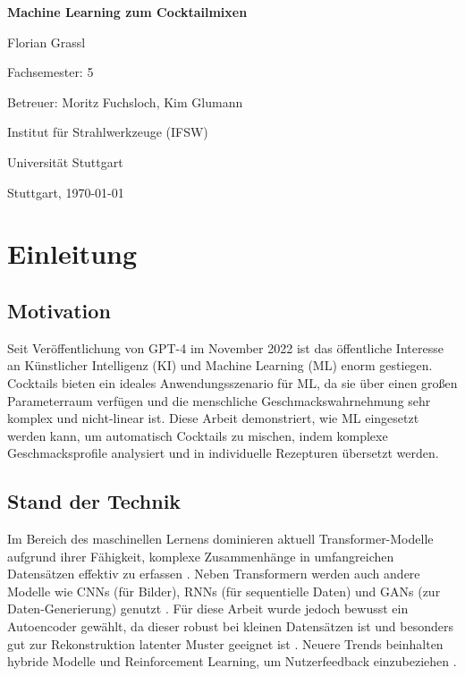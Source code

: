 \documentclass[12pt, a4paper]{report}
\begin{document}
\begin{titlepage}
    \centering
    \vspace*{3cm}
    {\huge \textbf{Machine Learning zum Cocktailmixen} \par}
    \vspace{2cm}
    {\large Florian Grassl \par}
    \vspace{1cm}
    Fachsemester: 5 \par
    \vspace{1cm}
    Betreuer: Moritz Fuchsloch, Kim Glumann \par
    Institut für Strahlwerkzeuge (IFSW) \par
    Universität Stuttgart \par
    \vfill
    Stuttgart, \today
\end{titlepage}

\tableofcontents
\clearpage

\chapter{Einleitung}

\section{Motivation}
Seit Veröffentlichung von GPT-4 im November 2022 ist das öffentliche Interesse an Künstlicher Intelligenz (KI) und Machine Learning (ML) enorm gestiegen. Cocktails bieten ein ideales Anwendungsszenario für ML, da sie über einen großen Parameterraum verfügen und die menschliche Geschmackswahrnehmung sehr komplex und nicht-linear ist. Diese Arbeit demonstriert, wie ML eingesetzt werden kann, um automatisch Cocktails zu mischen, indem komplexe Geschmacksprofile analysiert und in individuelle Rezepturen übersetzt werden.

\section{Stand der Technik}
Im Bereich des maschinellen Lernens dominieren aktuell Transformer-Modelle aufgrund ihrer Fähigkeit, komplexe Zusammenhänge in umfangreichen Datensätzen effektiv zu erfassen \cite{vaswani2017attention}. Neben Transformern werden auch andere Modelle wie CNNs (für Bilder), RNNs (für sequentielle Daten) und GANs (zur Daten-Generierung) genutzt \cite{goodfellow2014generative}. Für diese Arbeit wurde jedoch bewusst ein Autoencoder gewählt, da dieser robust bei kleinen Datensätzen ist und besonders gut zur Rekonstruktion latenter Muster geeignet ist \cite{goodfellow2016deep}. Neuere Trends beinhalten hybride Modelle und Reinforcement Learning, um Nutzerfeedback einzubeziehen \cite{sutton2018reinforcement}.
\end{document}
